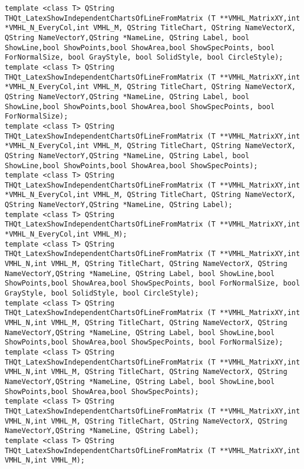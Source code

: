 \documentclass[a4paper,12pt]{article}
\begin{document}
\begin{lstlisting}[label=code_syntax_THQt_LatexShowIndependentChartsOfLineFromMatrix,caption=Синтаксис]
template <class T> QString THQt_LatexShowIndependentChartsOfLineFromMatrix (T **VMHL_MatrixXY,int *VMHL_N_EveryCol,int VMHL_M, QString TitleChart, QString NameVectorX, QString NameVectorY,QString *NameLine, QString Label, bool ShowLine,bool ShowPoints,bool ShowArea,bool ShowSpecPoints, bool ForNormalSize, bool GrayStyle, bool SolidStyle, bool CircleStyle);
template <class T> QString THQt_LatexShowIndependentChartsOfLineFromMatrix (T **VMHL_MatrixXY,int *VMHL_N_EveryCol,int VMHL_M, QString TitleChart, QString NameVectorX, QString NameVectorY,QString *NameLine, QString Label, bool ShowLine,bool ShowPoints,bool ShowArea,bool ShowSpecPoints, bool ForNormalSize);
template <class T> QString THQt_LatexShowIndependentChartsOfLineFromMatrix (T **VMHL_MatrixXY,int *VMHL_N_EveryCol,int VMHL_M, QString TitleChart, QString NameVectorX, QString NameVectorY,QString *NameLine, QString Label, bool ShowLine,bool ShowPoints,bool ShowArea,bool ShowSpecPoints);
template <class T> QString THQt_LatexShowIndependentChartsOfLineFromMatrix (T **VMHL_MatrixXY,int *VMHL_N_EveryCol,int VMHL_M, QString TitleChart, QString NameVectorX, QString NameVectorY,QString *NameLine, QString Label);
template <class T> QString THQt_LatexShowIndependentChartsOfLineFromMatrix (T **VMHL_MatrixXY,int *VMHL_N_EveryCol,int VMHL_M);
template <class T> QString THQt_LatexShowIndependentChartsOfLineFromMatrix (T **VMHL_MatrixXY,int VMHL_N,int VMHL_M, QString TitleChart, QString NameVectorX, QString NameVectorY,QString *NameLine, QString Label, bool ShowLine,bool ShowPoints,bool ShowArea,bool ShowSpecPoints, bool ForNormalSize, bool GrayStyle, bool SolidStyle, bool CircleStyle);
template <class T> QString THQt_LatexShowIndependentChartsOfLineFromMatrix (T **VMHL_MatrixXY,int VMHL_N,int VMHL_M, QString TitleChart, QString NameVectorX, QString NameVectorY,QString *NameLine, QString Label, bool ShowLine,bool ShowPoints,bool ShowArea,bool ShowSpecPoints, bool ForNormalSize);
template <class T> QString THQt_LatexShowIndependentChartsOfLineFromMatrix (T **VMHL_MatrixXY,int VMHL_N,int VMHL_M, QString TitleChart, QString NameVectorX, QString NameVectorY,QString *NameLine, QString Label, bool ShowLine,bool ShowPoints,bool ShowArea,bool ShowSpecPoints);
template <class T> QString THQt_LatexShowIndependentChartsOfLineFromMatrix (T **VMHL_MatrixXY,int VMHL_N,int VMHL_M, QString TitleChart, QString NameVectorX, QString NameVectorY,QString *NameLine, QString Label);
template <class T> QString THQt_LatexShowIndependentChartsOfLineFromMatrix (T **VMHL_MatrixXY,int VMHL_N,int VMHL_M);
\end{lstlisting}
\end{document}
